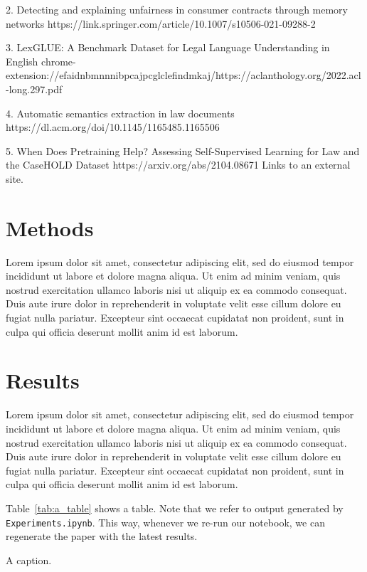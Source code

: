 \documentclass[11pt,a4paper]{article}
\begin{document}
2. Detecting and explaining unfairness in consumer contracts through memory networks
https://link.springer.com/article/10.1007/s10506-021-09288-2

3. LexGLUE: A Benchmark Dataset for Legal Language Understanding in English
chrome-extension://efaidnbmnnnibpcajpcglclefindmkaj/https://aclanthology.org/2022.acl-long.297.pdf

4. Automatic semantics extraction in law documents
https://dl.acm.org/doi/10.1145/1165485.1165506 

5. When Does Pretraining Help? Assessing Self-Supervised Learning for Law and the CaseHOLD Dataset
https://arxiv.org/abs/2104.08671 Links to an external site. 

\section{Methods}

Lorem ipsum dolor sit amet, consectetur adipiscing elit, sed do eiusmod tempor incididunt ut labore et dolore magna aliqua. Ut enim ad minim veniam, quis nostrud exercitation ullamco laboris nisi ut aliquip ex ea commodo consequat. Duis aute irure dolor in reprehenderit in voluptate velit esse cillum dolore eu fugiat nulla pariatur. Excepteur sint occaecat cupidatat non proident, sunt in culpa qui officia deserunt mollit anim id est laborum.



\section{Results}

Lorem ipsum dolor sit amet, consectetur adipiscing elit, sed do eiusmod tempor incididunt ut labore et dolore magna aliqua. Ut enim ad minim veniam, quis nostrud exercitation ullamco laboris nisi ut aliquip ex ea commodo consequat. Duis aute irure dolor in reprehenderit in voluptate velit esse cillum dolore eu fugiat nulla pariatur. Excepteur sint occaecat cupidatat non proident, sunt in culpa qui officia deserunt mollit anim id est laborum.


Table~\ref{tab:a_table} shows a table. Note that we refer to output generated by \texttt{Experiments.ipynb}. This way, whenever we re-run our notebook, we can regenerate the paper with the latest results.

\begin{table}[ht]
\centering

\caption{\label{tab:a_table} A caption. }
\end{table}
\end{document}
